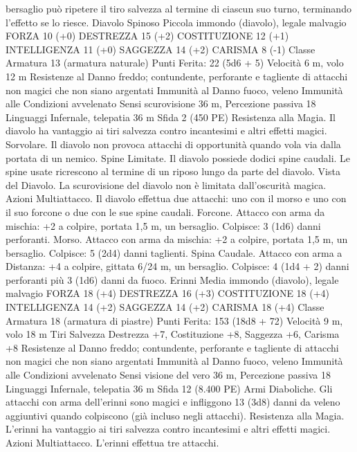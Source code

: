 \begin{multicols}{2}
bersaglio può ripetere il tiro salvezza al termine di ciascun suo
turno, terminando l’effetto se lo riesce.
Diavolo Spinoso
Piccola immondo (diavolo), legale malvagio
FORZA 10 (+0)
DESTREZZA 15 (+2)
COSTITUZIONE 12 (+1)
INTELLIGENZA 11 (+0)
SAGGEZZA 14 (+2)
CARISMA 8 (-1)
Classe Armatura 13 (armatura naturale)
\hspace*{0pt}\hfill{Punti Ferita}: 22 (5d6 + 5)
Velocità 6 m, volo 12 m
Resistenze al Danno freddo; contundente, perforante e tagliente
di attacchi non magici che non siano argentati
Immunità al Danno fuoco, veleno
Immunità alle Condizioni avvelenato
Sensi scurovisione 36 m, Percezione passiva 18
Linguaggi Infernale, telepatia 36 m
Sfida 2 (450 PE)
Resistenza alla Magia. Il diavolo ha vantaggio ai tiri salvezza
contro incantesimi e altri effetti magici.
Sorvolare. Il diavolo non provoca attacchi di opportunità quando
vola via dalla portata di un nemico.
Spine Limitate. Il diavolo possiede dodici spine caudali. Le
spine usate ricrescono al termine di un riposo lungo da parte del
diavolo.
Vista del Diavolo. La scurovisione del diavolo non è limitata
dall’oscurità magica.
Azioni
Multiattacco. Il diavolo effettua due attacchi: uno con il morso e
uno con il suo forcone o due con le sue spine caudali.
Forcone. Attacco con arma da mischia: +2 a colpire, portata 1,5
m, un bersaglio.
Colpisce: 3 (1d6) danni perforanti.
Morso. Attacco con arma da mischia: +2 a colpire, portata 1,5
m, un bersaglio.
Colpisce: 5 (2d4) danni taglienti.
Spina Caudale. Attacco con arma a Distanza: +4 a colpire,
gittata 6/24 m, un bersaglio.
Colpisce: 4 (1d4 + 2) danni perforanti più 3 (1d6) danni da
fuoco.
Erinni
Media immondo (diavolo), legale malvagio
FORZA 18 (+4)
DESTREZZA 16 (+3)
COSTITUZIONE 18 (+4)
INTELLIGENZA 14 (+2)
SAGGEZZA 14 (+2)
CARISMA 18 (+4)
Classe Armatura 18 (armatura di piastre)
\hspace*{0pt}\hfill{Punti Ferita}: 153 (18d8 + 72)
Velocità 9 m, volo 18 m
Tiri Salvezza Destrezza +7, Costituzione +8, Saggezza +6,
Carisma +8
Resistenze al Danno freddo; contundente, perforante e tagliente
di attacchi non magici che non siano argentati
Immunità al Danno fuoco, veleno
Immunità alle Condizioni avvelenato
Sensi visione del vero 36 m, Percezione passiva 18
Linguaggi Infernale, telepatia 36 m
Sfida 12 (8.400 PE)
Armi Diaboliche. Gli attacchi con arma dell’erinni sono magici e
infliggono 13 (3d8) danni da veleno aggiuntivi quando
colpiscono (già incluso negli attacchi).
Resistenza alla Magia. L’erinni ha vantaggio ai tiri salvezza
contro incantesimi e altri effetti magici.
Azioni
Multiattacco. L’erinni effettua tre attacchi.

\end{multicols}
